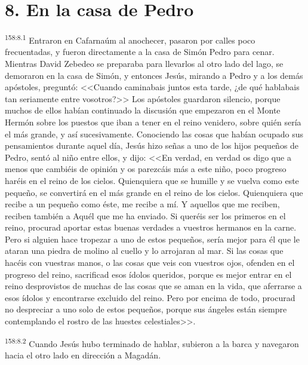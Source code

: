 \section*{8. En la casa de Pedro}
\par 
\textsuperscript{158:8.1} Entraron en Cafarnaúm al anochecer, pasaron por calles poco frecuentadas, y fueron directamente a la casa de Simón Pedro para cenar. Mientras David Zebedeo se preparaba para llevarlos al otro lado del lago, se demoraron en la casa de Simón, y entonces Jesús, mirando a Pedro y a los demás apóstoles, preguntó: <<Cuando caminabais juntos esta tarde, ¿de qué hablabais tan seriamente entre vosotros?>> Los apóstoles guardaron silencio, porque muchos de ellos habían continuado la discusión que empezaron en el Monte Hermón sobre los puestos que iban a tener en el reino venidero, sobre quién sería el más grande, y así sucesivamente. Conociendo las cosas que habían ocupado sus pensamientos durante aquel día, Jesús hizo señas a uno de los hijos pequeños de Pedro, sentó al niño entre ellos, y dijo: <<En verdad, en verdad os digo que a menos que cambiéis de opinión y os parezcáis más a este niño, poco progreso haréis en el reino de los cielos. Quienquiera que se humille y se vuelva como este pequeño, se convertirá en el más grande en el reino de los cielos. Quienquiera que recibe a un pequeño como éste, me recibe a mí. Y aquellos que me reciben, reciben también a Aquél que me ha enviado. Si queréis ser los primeros en el reino, procurad aportar estas buenas verdades a vuestros hermanos en la carne. Pero si alguien hace tropezar a uno de estos pequeños, sería mejor para él que le ataran una piedra de molino al cuello y lo arrojaran al mar. Si las cosas que hacéis con vuestras manos, o las cosas que veis con vuestros ojos, ofenden en el progreso del reino, sacrificad esos ídolos queridos, porque es mejor entrar en el reino desprovistos de muchas de las cosas que se aman en la vida, que aferrarse a esos ídolos y encontrarse excluido del reino. Pero por encima de todo, procurad no despreciar a uno solo de estos pequeños, porque sus ángeles están siempre contemplando el rostro de las huestes celestiales>>.

\par 
\textsuperscript{158:8.2} Cuando Jesús hubo terminado de hablar, subieron a la barca y navegaron hacia el otro lado en dirección a Magadán.